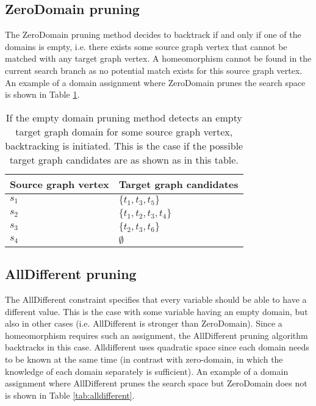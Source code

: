 \subsection{ZeroDomain pruning}
The ZeroDomain pruning method decides to backtrack if and only if one of the domains is empty, i.e. there exists some source graph vertex that cannot be matched with any target graph vertex. A homeomorphism cannot be found in the current search branch as no potential match exists for this source graph vertex. An example of a domain assignment where ZeroDomain prunes the search space is shown in Table \ref{tab:zerodomain}.

\label{sec:emptyDomain}
\begin{table}
\centering
\begin{tabular}{|l|l|}
\hline
\textbf{Source graph vertex} & \textbf{Target graph candidates} \\ \hline
$s_1$                          & $\{t_1, t_3, t_5\}$         \\ \hline
$s_2$                          & $\{t_1, t_2, t_3, t_4\}$       \\ \hline
$s_3$                          & $\{t_2, t_3, t_6\}$      \\ \hline
$s_4$                          & $\emptyset$                      \\ \hline
\end{tabular}
\caption{If the empty domain pruning method detects an empty target graph domain for some source graph vertex, backtracking is initiated. This is the case if the possible target graph candidates are as shown as in this table.}
\label{tab:zerodomain}
\end{table}

\subsection{AllDifferent pruning}
\label{sec:alldifferent}
The AllDifferent constraint specifies that every variable should be able to have a different value. This is the case with some variable having an empty domain, but also in other cases (i.e. AllDifferent is stronger than ZeroDomain). Since a homeomorphism requires such an assignment, the AllDifferent pruning algorithm backtracks in this case. Alldifferent uses quadratic space since each domain needs to be known at the same time (in contrast with zero-domain, in which the knowledge of each domain separately is sufficient). An example of a domain assignment where AllDifferent prunes the search space but ZeroDomain does not is shown in Table \ref{tab:alldifferent}. 

